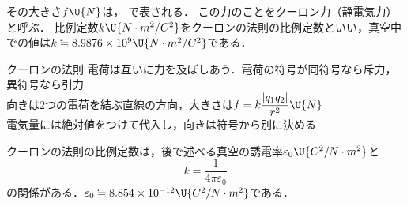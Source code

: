 \noindent その大きさ$f\U{N}$は，
で表される．
この力のことを{\gtfamily クーロン力}（静電気力）と呼ぶ．
比例定数$k\U{N\cdot m^2/C^2}$をクーロンの法則の比例定数といい，真空中での値は$k\fallingdotseq 8.9876\times 10^9\U{N\cdot m^2/C^2}$である．

\begin{matome}{クーロンの法則}
 \hspace{3mm} 電荷は互いに力を及ぼしあう．電荷の符号が{\gtfamily 同符号なら斥力，異符号なら引力}\\[1mm]
 \hspace{8mm} 向きは2つの電荷を結ぶ直線の方向，大きさは\hspace{3mm}$f=k\dfrac{|q_1q_2|}{r^2}\U{N}$\\[1mm]
 \hspace{3mm} {\gtfamily 電気量には絶対値をつけて代入し，向きは符号から別に決める}
\end{matome}

クーロンの法則の比例定数は，後で述べる真空の誘電率$\varepsilon_0\U{C^2/N\cdot m^2}$と
\[k=\frac{1}{4\pi\varepsilon_0}\]
の関係がある．$\varepsilon_0\fallingdotseq 8.854\times 10^{-12}\U{C^2/N\cdot m^2}$である．

